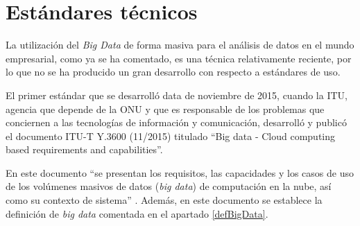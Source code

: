 \clearpage
\section{Estándares técnicos}
La utilización del \textit{Big Data} de forma masiva para el análisis de datos en el mundo empresarial, como ya se ha comentado, es una técnica relativamente reciente, por lo que no se ha producido un gran desarrollo con respecto a estándares de uso.

El primer estándar que se desarrolló data de noviembre de 2015, cuando la \gls{ITU}, agencia que depende de la \gls{ONU} y que es responsable de los problemas que conciernen a las tecnologías de información y comunicación, desarrolló y publicó el documento ITU-T Y.3600 (11/2015) \cite{estandar} titulado ``Big data - Cloud computing based requirements and capabilities''.

En este documento ``se presentan los requisitos, las capacidades y los casos de uso de los volúmenes masivos de datos (\textit{big data}) de computación en la nube, así como su contexto de sistema'' \cite{estandar}. Además, en este documento se establece la definición de \textit{big data} comentada en el apartado \ref{defBigData}.
